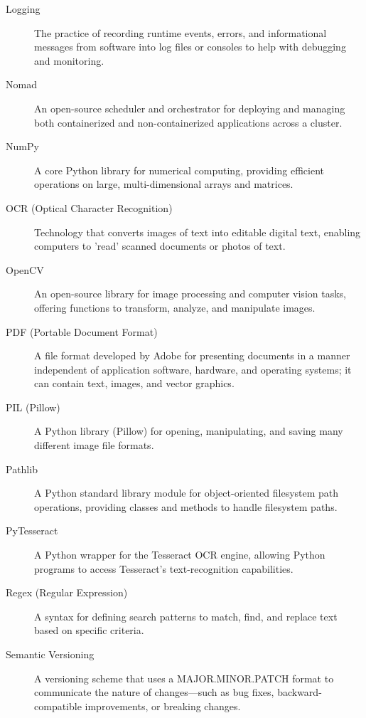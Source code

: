 \documentclass[11pt,a4paper]{article}
\begin{document}
\begin{description}
  \item[Logging] The practice of recording runtime events, errors, and informational messages from software into log files or consoles to help with debugging and monitoring.

  \item[Nomad] An open-source scheduler and orchestrator for deploying and managing both containerized and non-containerized applications across a cluster.

  \item[NumPy] A core Python library for numerical computing, providing efficient operations on large, multi-dimensional arrays and matrices.

  \item[OCR (Optical Character Recognition)] Technology that converts images of text into editable digital text, enabling computers to 'read' scanned documents or photos of text.

  \item[OpenCV] An open-source library for image processing and computer vision tasks, offering functions to transform, analyze, and manipulate images.

  \item[PDF (Portable Document Format)] A file format developed by Adobe for presenting documents in a manner independent of application software, hardware, and operating systems; it can contain text, images, and vector graphics.

  \item[PIL (Pillow)] A Python library (Pillow) for opening, manipulating, and saving many different image file formats.

  \item[Pathlib] A Python standard library module for object-oriented filesystem path operations, providing classes and methods to handle filesystem paths.

  \item[PyTesseract] A Python wrapper for the Tesseract OCR engine, allowing Python programs to access Tesseract's text-recognition capabilities.

  \item[Regex (Regular Expression)] A syntax for defining search patterns to match, find, and replace text based on specific criteria.

  \item[Semantic Versioning] A versioning scheme that uses a MAJOR.MINOR.PATCH format to communicate the nature of changes—such as bug fixes, backward-compatible improvements, or breaking changes.


\end{description}
\end{document}
